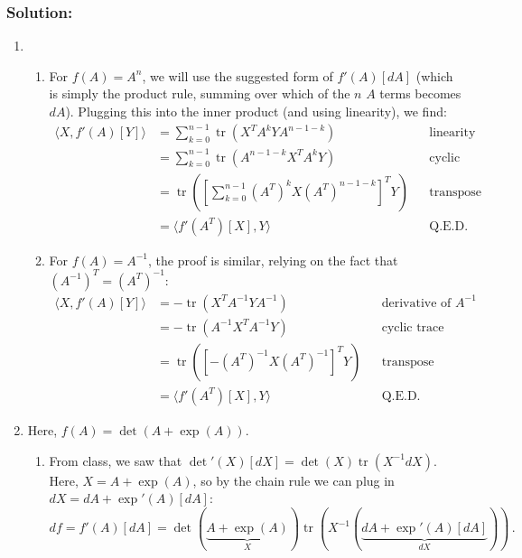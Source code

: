 \documentclass[10pt,oneside]{article}
\newcommand{\tr}{\operatorname{tr}}
\begin{document}
\subsubsection*{Solution:}

\begin{enumerate}
    \item 
   \begin{enumerate}
    \item For $f(A) = A^n$, we will use the suggested form of $f'(A)[dA]$ (which is simply the product rule, summing over which of the $n$ $A$ terms becomes $dA$).  Plugging this into the inner product (and using linearity), we find:
    \begin{align*}
    \langle X, f'(A)[Y] \rangle &=
    \sum_{k=0}^{n-1} \tr \left( X^T A^k Y A^{n-1-k} \right) && \text{linearity}\\
    &= \sum_{k=0}^{n-1} \tr \left( A^{n-1-k} X^T A^k Y  \right)
     && \text{cyclic trace}\\
    &=  \tr \left(   \left[ \sum_{k=0}^{n-1} (A^T)^k X (A^T)^{n-1-k} \right] ^T  Y  \right)
     && \text{transpose + linearity} \\
     &= \langle f'(A^T)[X], Y \rangle && \text{Q.E.D.}
    \end{align*}

    \item For $f(A) = A^{-1}$, the proof is similar, relying on the fact that $(A^{-1})^T = (A^T)^{-1}$:
    \begin{align*}
    \langle X, f'(A)[Y] \rangle &= -\tr\left( X^T A^{-1} Y A^{-1} \right) && \text{derivative of }A^{-1}\\
    &= -\tr\left( A^{-1} X^T A^{-1} Y  \right) && \text{cyclic trace}\\
    &= \tr\left( [-(A^T)^{-1} X (A^T)^{-1}]^T Y  \right) && \text{transpose}\\
     &= \langle f'(A^T)[X], Y \rangle && \text{Q.E.D.}
    \end{align*}
    
    \end{enumerate}
    
    \item Here, $f(A)=\det(A+\exp(A))$.
     
   \begin{enumerate}
   \item
   From class, we saw that $\det'(X)[dX] = \det(X) \tr(X^{-1} dX)$.  Here, $X = A + \exp(A)$, so by the chain rule we can plug in $dX = dA + \exp'(A)[dA]$:
    $$
    df = f'(A)[dA] = \boxed{\det(\underbrace{A + \exp(A)}_X) \tr\left( X^{-1} (\underbrace{dA +\exp'(A)[dA]}_{dX})  \right)} \, .
    $$


\end{enumerate}
\end{enumerate}
\end{document}
